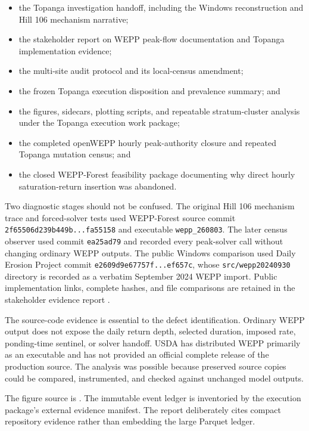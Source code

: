 \documentclass[11pt]{article}
\begin{document}
\begin{itemize}
  \item the Topanga investigation handoff, including the Windows reconstruction
    and Hill 106 mechanism narrative;
  \item the stakeholder report on WEPP peak-flow documentation and Topanga
    implementation evidence;
  \item the multi-site audit protocol and its local-census amendment;
  \item the frozen Topanga execution disposition and prevalence summary; and
  \item the figures, sidecars, plotting scripts, and repeatable stratum-cluster
    analysis under the Topanga execution work package;
  \item the completed openWEPP hourly peak-authority closure and repeated
    Topanga mutation census; and
  \item the closed WEPP-Forest feasibility package documenting why direct
    hourly saturation-return insertion was abandoned.
\end{itemize}

Two diagnostic stages should not be confused. The original Hill 106 mechanism
trace and forced-solver tests used WEPP-Forest source commit
\texttt{2f65506d239b449b...fa55158} and executable \texttt{wepp\_260803}.
The later census observer used commit \texttt{ea25ad79} and recorded every
peak-solver call without changing ordinary WEPP outputs. The public Windows
comparison used Daily Erosion Project commit
\texttt{e2609d9e67757f...ef657c}, whose \texttt{src/wepp20240930} directory is
recorded as a verbatim September 2024 WEPP import. Public implementation links,
complete hashes, and file comparisons are retained in the stakeholder evidence
report \cite{stakeholder}.

The source-code evidence is essential to the defect identification. Ordinary
WEPP output does not expose the daily return depth, selected duration, imposed
rate, ponding-time sentinel, or solver handoff. USDA has distributed WEPP
primarily as an executable and has not provided an official complete release
of the production source. The analysis was possible because preserved source
copies could be compared, instrumented, and checked against unchanged model
outputs.

The figure source is
.
The immutable event ledger is inventoried by the execution package's external
evidence manifest. The report deliberately cites compact repository evidence
rather than embedding the large Parquet ledger.
\end{document}
